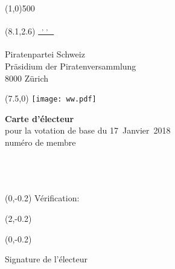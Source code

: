 \documentclass[11pt, a4paper]{scrartcl}
\begin{document}
{\begin{minipage}[t][13.42cm][t]{\textwidth}
\end{minipage}

\line(1,0){500}
\vspace{1cm}

\begin{minipage}[t][12.5cm][t]{\textwidth}

\begin{textblock}{9}(8.1,2.6)
\underline{\textsuperscript*{ \givenname~\surname, \street, \postalcode~\location }} \\
\vspace{-0.3cm} \\
Piratenpartei Schweiz \\
Präsidium der Piratenversammlung \\
8000 Zürich
\end{textblock}

\begin{textblock}{6}(7.5,0)
\texttt{[image: ww.pdf]}
\end{textblock}

{\LARGE\textbf{Carte d'électeur}} \\
pour la votation de base du 17~Janvier~2018 \\

numéro de membre \textbf{\id}   \\
\givenname~\surname         \\
\street                     \\
\postalcode~\location       \\
%

\begin{textblock}{6}(0,-0.2)
Vérification:
\end{textblock}

\begin{textblock}{4}(2,-0.2)
\raggedright
\code
\end{textblock}

\vspace{4cm}

\begin{textblock}{6}(0,-0.2)
\begin{framed}
Signature de l'électeur \\
\vspace{1.5cm} ~ \\
\end{framed}
\end{textblock}


\end{minipage}}
\end{document}
